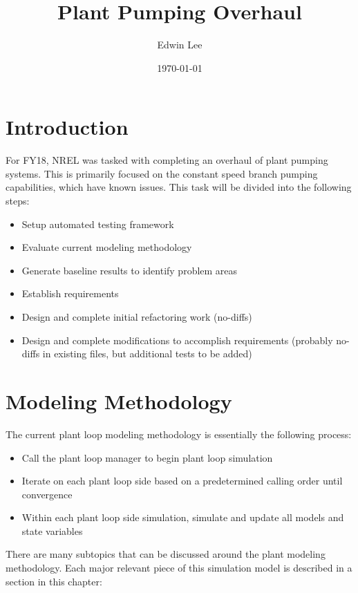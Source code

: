 \documentclass{report}
\title{Plant Pumping Overhaul}
\author{Edwin Lee}
\date{\today}
\begin{document}
  \maketitle

  \tableofcontents

  \chapter{Introduction}\label{ch:intro}

    For FY18, NREL was tasked with completing an overhaul of plant pumping systems.
    This is primarily focused on the constant speed branch pumping capabilities, which have known issues.
    This task will be divided into the following steps:

    \begin{itemize}
      \item Setup automated testing framework
      \item Evaluate current modeling methodology
      \item Generate baseline results to identify problem areas
      \item Establish requirements
      \item Design and complete initial refactoring work (no-diffs)
      \item Design and complete modifications to accomplish requirements (probably no-diffs in existing files, but additional tests to be added)
    \end{itemize}

  \chapter{Modeling Methodology}\label{ch:modeling}

    The current plant loop modeling methodology is essentially the following process:

    \begin{itemize}
      \item Call the plant loop manager to begin plant loop simulation
      \item Iterate on each plant loop side based on a predetermined calling order until convergence
      \item Within each plant loop side simulation, simulate and update all models and state variables
    \end{itemize}

    There are many subtopics that can be discussed around the plant modeling methodology.
    Each major relevant piece of this simulation model is described in a section in this chapter:
\end{document}
